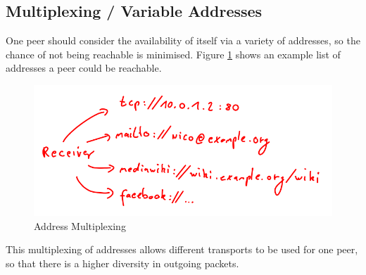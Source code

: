\subsection{Multiplexing / Variable Addresses}
\label{multiplexing}
One peer should consider the availability of itself via a variety
of addresses, so the chance of not being reachable is minimised.
Figure \ref{addressmultiplexing} shows an example list of addresses
a peer could be reachable.
\begin{figure}
    \centering
    \caption{Address Multiplexing}
    \label{addressmultiplexing}
    \includegraphics[scale=0.8]{addressmultiplexing.png}
\end{figure}
This multiplexing of addresses allows different transports to be used
for one peer, so that there is a higher diversity in outgoing packets.
